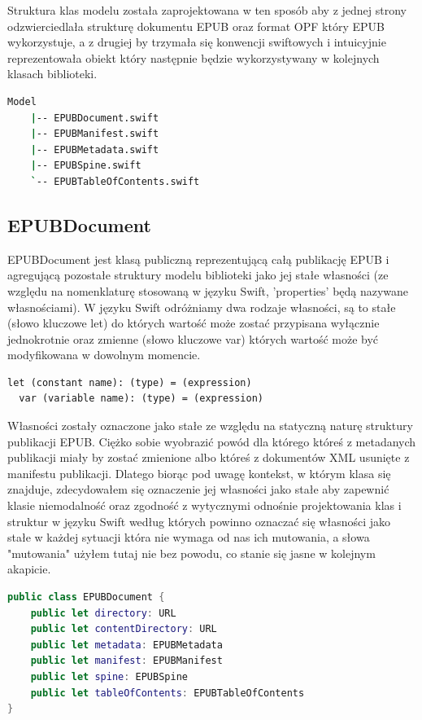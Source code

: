 Struktura klas modelu została zaprojektowana w ten sposób aby z jednej strony odzwierciedlała strukturę dokumentu EPUB oraz format OPF który EPUB wykorzystuje, a z drugiej by trzymała się konwencji swiftowych i intuicyjnie reprezentowała obiekt który następnie będzie wykorzystywany w kolejnych klasach biblioteki.

\begin{lstlisting}[caption={Struktura modelu EPUBKit.}, language=bash]
    Model
    |-- EPUBDocument.swift
    |-- EPUBManifest.swift
    |-- EPUBMetadata.swift
    |-- EPUBSpine.swift
    `-- EPUBTableOfContents.swift
\end{lstlisting}

\subsection{EPUBDocument}
\label{EPUBDocument}
EPUBDocument jest klasą publiczną reprezentującą całą publikację EPUB i agregującą pozostałe struktury modelu biblioteki jako jej stałe własności (ze względu na nomenklaturę stosowaną w języku Swift, 'properties' będą nazywane własnościami). W języku Swift odróżniamy dwa rodzaje własności, są to stałe (słowo kluczowe let) do których wartość może zostać przypisana wyłącznie jednokrotnie oraz zmienne (słowo kluczowe var) których wartość może być modyfikowana w dowolnym momencie.

\begin{lstlisting}[caption={Deklaracje własności w Swifcie.\cite{theSwiftProgrammingLanguageDeclarations}}, language=swift-reference]
  let (constant name): (type) = (expression)
  var (variable name): (type) = (expression)
\end{lstlisting}

Własności zostały oznaczone jako stałe ze względu na statyczną naturę struktury publikacji EPUB. Ciężko sobie wyobrazić powód dla którego któreś z metadanych publikacji miały by zostać zmienione albo któreś z dokumentów XML usunięte z manifestu publikacji. Dlatego biorąc pod uwagę kontekst, w którym klasa się znajduje, zdecydowałem się oznaczenie jej własności jako stałe aby zapewnić klasie niemodalność oraz zgodność z wytycznymi odnośnie projektowania klas i struktur w języku Swift według których powinno oznaczać się własności jako stałe w każdej sytuacji która nie wymaga od nas ich mutowania, a słowa "mutowania" użyłem tutaj nie bez powodu, co stanie się jasne w kolejnym akapicie.

\begin{lstlisting}[caption={Klasa EPUBDocument i jej stałe publiczne.}, language=swift]
public class EPUBDocument {
    public let directory: URL
    public let contentDirectory: URL
    public let metadata: EPUBMetadata
    public let manifest: EPUBManifest
    public let spine: EPUBSpine
    public let tableOfContents: EPUBTableOfContents
}
\end{lstlisting}

